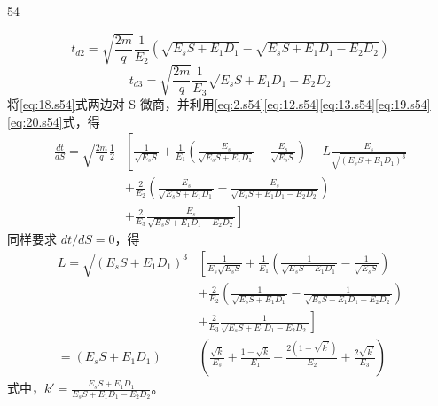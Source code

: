 \begin{solution}{54}
\begin{subsolution}
\begin{equation}
t_{d2} = \sqrt{\frac{2m}{q}}\frac{1}{E_{2}}\left(\sqrt{E_{s}S+E_{1}D_{1}} - \sqrt{E_{s}S+E_{1}D_{1}-E_{2}D_{2}}\right)
\label{eq:19.s54}
\end{equation}
\begin{equation}
t_{d3} = \sqrt{\frac{2m}{q}}\frac{1}{E_{3}}\sqrt{E_{s}S+E_{1}D_{1}-E_{2}D_{2}}
\label{eq:20.s54}
\end{equation}
将\eqref{eq:18.s54}式两边对 S 微商，并利用\eqref{eq:2.s54}\eqref{eq:12.s54}\eqref{eq:13.s54}\eqref{eq:19.s54}\eqref{eq:20.s54}式，得
\begin{equation}
\begin{array}{rl}
\frac{dt}{dS} = \sqrt{\frac{2m}{q}}\frac{1}{2} & \left[ \frac{1}{\sqrt{E_{s}S}} + \frac{1}{E_{1}}\left(\frac{E_{s}}{\sqrt{E_{s}S+E_{1}D_{1}}} - \frac{E_{s}}{\sqrt{E_{s}S}}\right) - L\frac{E_{s}}{\sqrt{(E_{s}S+E_{1}D_{1})^{3}}} \right. \\
& \left. + \frac{2}{E_{2}}\left(\frac{E_{s}}{\sqrt{E_{s}S+E_{1}D_{1}}} - \frac{E_{s}}{\sqrt{E_{s}S+E_{1}D_{1}-E_{2}D_{2}}}\right) \right. \\
& \left. + \frac{2}{E_{3}}\frac{E_{s}}{\sqrt{E_{s}S+E_{1}D_{1}-E_{2}D_{2}}} \right]
\end{array}
\label{eq:21.s54}
\end{equation}
同样要求 $dt/dS = 0$，得
\begin{equation}
\begin{array}{rl}
L = \sqrt{(E_{s}S+E_{1}D_{1})^{3}} & \left[ \frac{1}{E_{s}\sqrt{E_{s}S}} + \frac{1}{E_{1}}\left(\frac{1}{\sqrt{E_{s}S+E_{1}D_{1}}} - \frac{1}{\sqrt{E_{s}S}}\right) \right. \\
& \left. + \frac{2}{E_{2}}\left(\frac{1}{\sqrt{E_{s}S+E_{1}D_{1}}} - \frac{1}{\sqrt{E_{s}S+E_{1}D_{1}-E_{2}D_{2}}}\right) \right. \\
& \left. + \frac{2}{E_{3}}\frac{1}{\sqrt{E_{s}S+E_{1}D_{1}-E_{2}D_{2}}} \right] \\
= (E_{s}S+E_{1}D_{1}) & \left(\frac{\sqrt{k}}{E_{s}} + \frac{1-\sqrt{k}}{E_{1}} + \frac{2(1-\sqrt{k^{\prime}})}{E_{2}} + \frac{2\sqrt{k^{\prime}}}{E_{3}}\right)
\end{array}
\label{eq:22.s54}
\end{equation}
式中，$k'=\frac{E_{s}S+E_{1}D_{1}}{E_{s}S+E_{1}D_{1}-E_{2}D_{2}}$。
\end{subsolution}
\end{solution}
